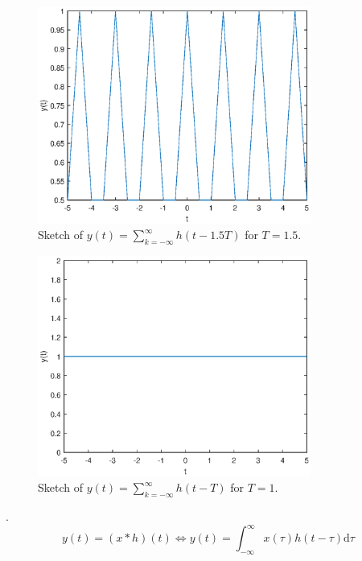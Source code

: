 \documentclass[a4paper]{article}
\begin{document}
\begin{figure}[H]
    \begin{center}
        \includegraphics[width=0.8\textwidth]{6(b)-3.eps}
    \end{center}
    \caption{Sketch of $y(t)=\sum_{k=-\infty}^\infty h(t-1.5T)$ for $T=1.5$.}
\end{figure}
\begin{figure}[H]
    \begin{center}
        \includegraphics[width=0.8\textwidth]{6(b)-4.eps}
    \end{center}
    \caption{Sketch of $y(t)=\sum_{k=-\infty}^\infty h(t-T)$ for $T=1$.}
\end{figure}
.
\begin{equation}
    y(t)=(x*h)(t)\Leftrightarrow y(t)=\int_{-\infty}^\infty x(\tau)h(t-\tau)\mathrm{d}\tau
\end{equation}
\end{document}
